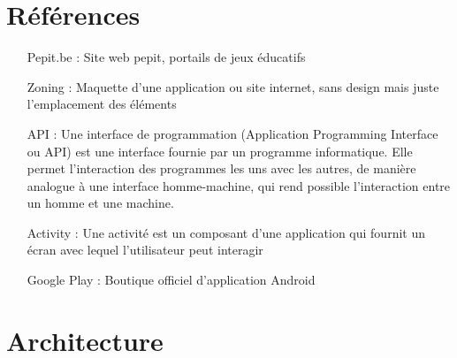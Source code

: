 \chapter{Références}
\begin{itemize}
\item[Pepit.be :] Site web pepit, portails de jeux éducatifs
\item[Zoning :] Maquette d'une application ou site internet, sans design mais juste l'emplacement des éléments
\item[API :] Une interface de programmation (Application Programming Interface ou API) est une interface fournie par un programme informatique. Elle permet l'interaction des programmes les uns avec les autres, de manière analogue à une interface homme-machine, qui rend possible l'interaction entre un homme et une machine.
\item[Activity :] Une activité est un composant d'une application qui fournit un écran avec lequel l'utilisateur peut interagir
\item[Google Play :] Boutique officiel d’application Android
\end{itemize}


%
%
%


\chapter{Architecture}
\label{annexe_architecture}



